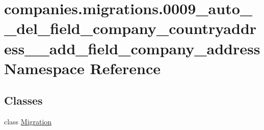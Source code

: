 \hypertarget{namespacecompanies_1_1migrations_1_10009__auto____del__field__company__countryaddress____add__field__company__address}{\section{companies.\-migrations.0009\-\_\-auto\-\_\-\-\_\-del\-\_\-field\-\_\-company\-\_\-countryaddress\-\_\-\-\_\-add\-\_\-field\-\_\-company\-\_\-address Namespace Reference}
\label{namespacecompanies_1_1migrations_1_10009__auto____del__field__company__countryaddress____add__field__company__address}
}
\subsection*{Classes}
\begin{DoxyCompactItemize}
\item 
class \hyperlink{classcompanies_1_1migrations_1_10009__auto____del__field__company__countryaddress____add__field__company__address_1_1_migration}{Migration}
\end{DoxyCompactItemize}
